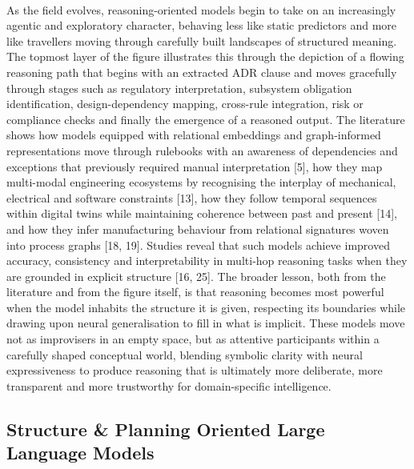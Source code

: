         \paragraph{}
        As the field evolves, reasoning-oriented models begin to take on an increasingly agentic and exploratory character, behaving less like static predictors and more like travellers moving through carefully built landscapes of structured meaning. The topmost layer of the figure illustrates this through the depiction of a flowing reasoning path that begins with an extracted ADR clause and moves gracefully through stages such as regulatory interpretation, subsystem obligation identification, design-dependency mapping, cross-rule integration, risk or compliance checks and finally the emergence of a reasoned output. The literature shows how models equipped with relational embeddings and graph-informed representations move through rulebooks with an awareness of dependencies and exceptions that previously required manual interpretation [5], how they map multi-modal engineering ecosystems by recognising the interplay of mechanical, electrical and software constraints [13], how they follow temporal sequences within digital twins while maintaining coherence between past and present [14], and how they infer manufacturing behaviour from relational signatures woven into process graphs [18, 19]. Studies reveal that such models achieve improved accuracy, consistency and interpretability in multi-hop reasoning tasks when they are grounded in explicit structure [16, 25]. The broader lesson, both from the literature and from the figure itself, is that reasoning becomes most powerful when the model inhabits the structure it is given, respecting its boundaries while drawing upon neural generalisation to fill in what is implicit. These models move not as improvisers in an empty space, but as attentive participants within a carefully shaped conceptual world, blending symbolic clarity with neural expressiveness to produce reasoning that is ultimately more deliberate, more transparent and more trustworthy for domain-specific intelligence.

    \newpage
    \subsection{Structure \& Planning Oriented Large Language Models}

